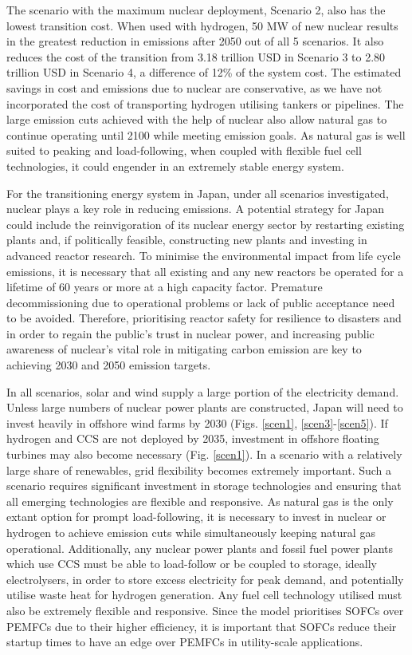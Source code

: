 The scenario with the maximum nuclear deployment, Scenario 2, also has the lowest transition cost. When used with hydrogen, 50 MW of new nuclear results in the greatest reduction in emissions after 2050 out of all 5 scenarios. It also reduces the cost of the transition from 3.18 trillion USD in Scenario 3 to 2.80 trillion USD in Scenario 4, a difference of 12\% of the system cost. The estimated savings in cost and emissions due to nuclear are conservative, as we have not incorporated the cost of transporting hydrogen utilising tankers or pipelines. The large emission cuts achieved with the help of nuclear also allow natural gas to continue operating until 2100 while meeting emission goals. As natural gas is well suited to peaking and load-following, when coupled with flexible fuel cell technologies, it could engender in an extremely stable energy system. 

For the transitioning energy system in Japan, under all scenarios investigated, nuclear plays a key role in reducing emissions. A potential strategy for Japan could include the reinvigoration of its nuclear energy sector by restarting existing plants and, if politically feasible, constructing new plants and investing in advanced reactor research. To minimise the environmental impact from life cycle emissions, it is necessary that all existing and any new reactors be operated for a lifetime of 60 years or more at a high capacity factor. Premature decommissioning due to operational problems or lack of public acceptance need to be avoided. Therefore, prioritising reactor safety for resilience to disasters and in order to regain the public's trust in nuclear power, and increasing public awareness of nuclear's vital role in mitigating carbon emission are key to achieving 2030 and 2050 emission targets.

In all scenarios, solar and wind supply a large portion of the electricity demand. Unless large numbers of nuclear power plants are constructed, Japan will need to invest heavily in offshore wind farms by 2030 (Figs. \ref{scen1}, \ref{scen3}-\ref{scen5}). If hydrogen and CCS are not deployed by 2035, investment in offshore floating turbines may also become necessary (Fig. \ref{scen1}). In a scenario with a relatively large share of renewables, grid flexibility becomes extremely important. Such a scenario requires significant investment in storage technologies and ensuring that all emerging technologies are flexible and responsive. As natural gas is the only extant option for prompt load-following, it is necessary to invest in nuclear or hydrogen to achieve emission cuts while simultaneously keeping natural gas operational. Additionally, any nuclear power plants and fossil fuel power plants which use CCS must be able to load-follow or be coupled to storage, ideally electrolysers, in order to store excess electricity for peak demand, and potentially utilise waste heat for hydrogen generation. Any fuel cell technology utilised must also be extremely flexible and responsive. Since the model prioritises \gls{SOFC}s over \gls{PEMFC}s due to their higher efficiency, it is important that \gls{SOFC}s reduce their startup times to have an edge over \gls{PEMFC}s in utility-scale applications.

